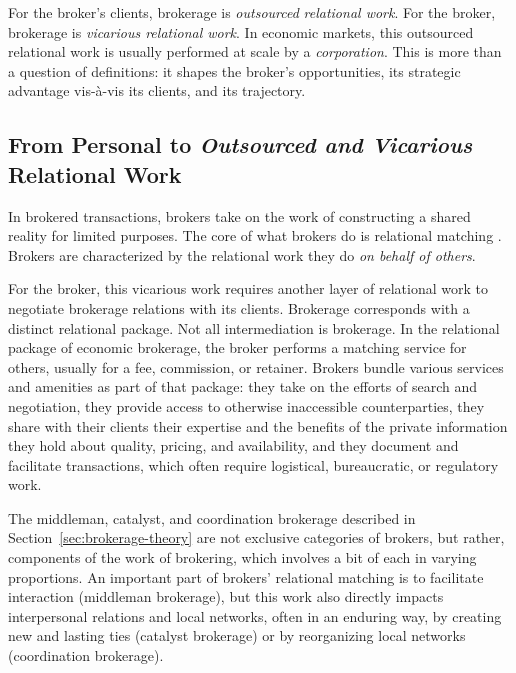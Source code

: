 \documentclass[
]{article}
\begin{document}
For the broker's clients, brokerage is \emph{outsourced} \emph{relational work}. For the broker, brokerage is \emph{vicarious relational work}. In economic markets, this outsourced relational work is usually performed at scale by a \emph{corporation}. This is more than a question of definitions: it shapes the broker's opportunities, its strategic advantage vis-à-vis its clients, and its trajectory.

\subsection{\texorpdfstring{From Personal to \emph{Outsourced and Vicarious} Relational Work}{From Personal to Outsourced and Vicarious Relational Work}}

In brokered transactions, brokers take on the work of constructing a shared reality for limited purposes. The core of what brokers do is relational matching \autocite[see][]{zelizerHowBecameRelational2012}. Brokers are characterized by the relational work they do \emph{on behalf of others}.

For the broker, this vicarious work requires another layer of relational work to negotiate brokerage relations with its clients. Brokerage corresponds with a distinct relational package. Not all intermediation is brokerage. In the relational package of economic brokerage, the broker performs a matching service for others, usually for a fee, commission, or retainer. Brokers bundle various services and amenities as part of that package: they take on the efforts of search and negotiation, they provide access to otherwise inaccessible counterparties, they share with their clients their expertise and the benefits of the private information they hold about quality, pricing, and availability, and they document and facilitate transactions, which often require logistical, bureaucratic, or regulatory work.

The middleman, catalyst, and coordination brokerage described in Section~\ref{sec:brokerage-theory} are not exclusive categories of brokers, but rather, components of the work of brokering, which involves a bit of each in varying proportions. An important part of brokers' relational matching is to facilitate interaction (middleman brokerage), but this work also directly impacts interpersonal relations and local networks, often in an enduring way, by creating new and lasting ties (catalyst brokerage) or by reorganizing local networks (coordination brokerage).
\end{document}

